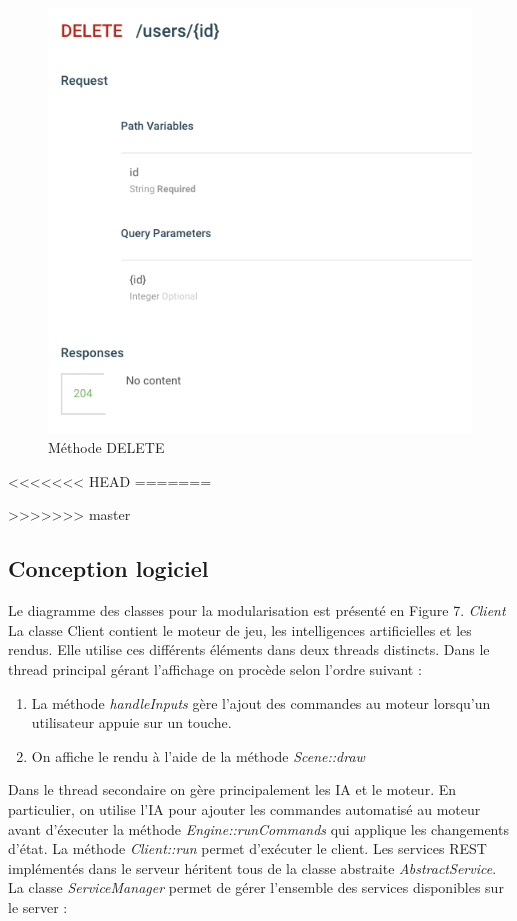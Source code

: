 \documentclass[a4paper,12pt]{article}
\begin{document}
    \begin{figure}[p]
    \includegraphics{DELETE.png}
    \caption{\label{uml:module}Méthode DELETE}
    \end{figure}
    
    
    
<<<<<<< HEAD
=======
    
>>>>>>> master
    \clearpage
    \subsection{Conception logiciel}
    Le diagramme des classes pour la modularisation est présenté en Figure 7.
    \emph{Client} La classe Client contient le moteur de jeu, les intelligences artificielles et les rendus. Elle utilise ces différents éléments dans deux threads distincts. Dans le thread principal gérant l'affichage on procède selon l'ordre suivant :
\begin{enumerate}
\item La méthode \emph{handleInputs} gère l'ajout des commandes au moteur lorsqu'un utilisateur appuie sur un touche.
\item On affiche le rendu à l'aide de la méthode \emph{Scene::draw}
\end{enumerate}

 Dans le thread secondaire on gère principalement les IA et le moteur. En particulier, on  utilise l'IA pour ajouter les commandes automatisé au moteur avant d'éxecuter la méthode \emph{Engine::runCommands} qui applique les changements d'état.
    La méthode \emph{Client::run} permet d'exécuter le client. 
    Les services REST implémentés dans le serveur héritent tous de la classe abstraite \emph{AbstractService}.  La classe \emph{ServiceManager} permet de gérer l'ensemble des services disponibles sur le server :
    
\end{document}
